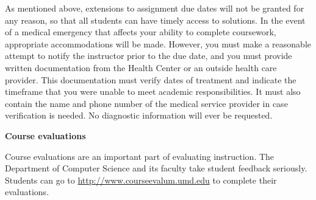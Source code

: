 \documentclass[11pt]{article}
\begin{document}
As mentioned above, extensions to assignment due dates will not be granted for any reason, so that all students can have timely access to solutions.  In the event of a medical emergency that affects your ability to complete coursework, appropriate accommodations will be made.  However, you must make a reasonable attempt to notify the instructor prior to the due date, and you must provide written documentation from the Health Center or an outside health care provider.  This documentation must verify dates of treatment and indicate the timeframe that you were unable to meet academic responsibilities. It must also contain the name and phone number of the medical service provider in case verification is needed. No diagnostic information will ever be requested.

\medskip

{\bf Course evaluations}

Course evaluations are an important part of evaluating instruction.  The Department of Computer Science and its faculty take student feedback seriously.  Students can go to \url{http://www.courseevalum.umd.edu} to complete their evaluations.
\end{document}
